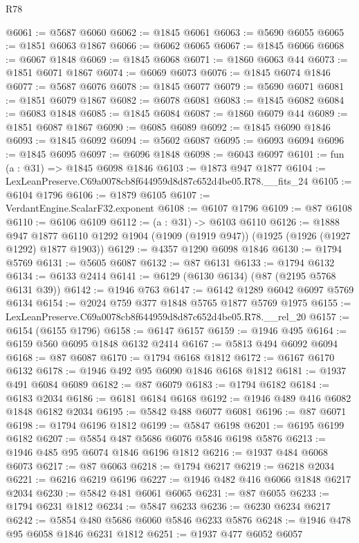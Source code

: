 \begin{lexlean}{R78}
\begin{coremodule}
@6061 := @5687 @6060
@6062 := @1845 @6061
@6063 := @5690 @6055
@6065 := @1851 @6063 @1867
@6066 := @6062 @6065
@6067 := @1845 @6066
@6068 := @6067 @1848
@6069 := @1845 @6068
@6071 := @1860 @6063 @44
@6073 := @1851 @6071 @1867
@6074 := @6069 @6073
@6076 := @1845 @6074 @1846
@6077 := @5687 @6076
@6078 := @1845 @6077
@6079 := @5690 @6071
@6081 := @1851 @6079 @1867
@6082 := @6078 @6081
@6083 := @1845 @6082
@6084 := @6083 @1848
@6085 := @1845 @6084
@6087 := @1860 @6079 @44
@6089 := @1851 @6087 @1867
@6090 := @6085 @6089
@6092 := @1845 @6090 @1846
@6093 := @1845 @6092
@6094 := @5602 @6087
@6095 := @6093 @6094
@6096 := @1845 @6095
@6097 := @6096 @1848
@6098 := @6043 @6097
@6101 := fun (a : @31) => @1845 @6098 @1846
@6103 := @1873 @947 @1877
@6104 := LexLeanPreserve.C69a0078cb8f644959d8d87c652d4be05.R78.__fits_24
@6105 := @6104 @1796
@6106 := @1879 @6105
@6107 := VerdantEngine.ScalarF32.exponent
@6108 := @6107 @1796
@6109 := @87 @6108
@6110 := @6106 @6109
@6112 := (a : @31) -> @6103 @6110
@6126 := @1888
    @947
    @1877
    @6110
    @1292
    @1904
    (@1909 (@1919 @947))
    (@1925 (@1926 (@1927 @1292) @1877 @1903))
@6129 := @4357 @1290 @6098 @1846
@6130 := @1794 @5769
@6131 := @5605 @6087
@6132 := @87 @6131
@6133 := @1794 @6132
@6134 := @6133 @2414
@6141 := @6129 (@6130 @6134) (@87 (@2195 @5768 @6131 @39))
@6142 := @1946 @763
@6147 := @6142 @1289 @6042 @6097 @5769 @6134
@6154 := @2024 @759 @377 @1848 @5765 @1877 @5769 @1975
@6155 := LexLeanPreserve.C69a0078cb8f644959d8d87c652d4be05.R78.__rel_20
@6157 := @6154 (@6155 @1796)
@6158 := @6147 @6157
@6159 := @1946 @495
@6164 := @6159 @560 @6095 @1848 @6132 @2414
@6167 := @5813 @494 @6092 @6094
@6168 := @87 @6087
@6170 := @1794 @6168 @1812
@6172 := @6167 @6170 @6132
@6178 := @1946 @492 @95 @6090 @1846 @6168 @1812
@6181 := @1937 @491 @6084 @6089
@6182 := @87 @6079
@6183 := @1794 @6182
@6184 := @6183 @2034
@6186 := @6181 @6184 @6168
@6192 := @1946 @489 @416 @6082 @1848 @6182 @2034
@6195 := @5842 @488 @6077 @6081
@6196 := @87 @6071
@6198 := @1794 @6196 @1812
@6199 := @5847 @6198
@6201 := @6195 @6199 @6182
@6207 := @5854 @487 @5686 @6076 @5846 @6198 @5876
@6213 := @1946 @485 @95 @6074 @1846 @6196 @1812
@6216 := @1937 @484 @6068 @6073
@6217 := @87 @6063
@6218 := @1794 @6217
@6219 := @6218 @2034
@6221 := @6216 @6219 @6196
@6227 := @1946 @482 @416 @6066 @1848 @6217 @2034
@6230 := @5842 @481 @6061 @6065
@6231 := @87 @6055
@6233 := @1794 @6231 @1812
@6234 := @5847 @6233
@6236 := @6230 @6234 @6217
@6242 := @5854 @480 @5686 @6060 @5846 @6233 @5876
@6248 := @1946 @478 @95 @6058 @1846 @6231 @1812
@6251 := @1937 @477 @6052 @6057

\end{coremodule}
\end{lexlean}

